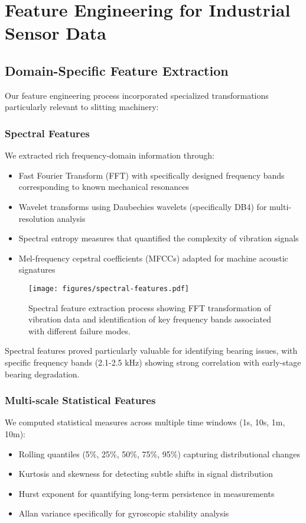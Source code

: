 \section{Feature Engineering for Industrial Sensor Data}
\subsection{Domain-Specific Feature Extraction}
Our feature engineering process incorporated specialized transformations particularly relevant to slitting machinery:

\subsubsection{Spectral Features}
We extracted rich frequency-domain information through:
\begin{itemize}
    \item Fast Fourier Transform (FFT) with specifically designed frequency bands corresponding to known mechanical resonances
    \item Wavelet transforms using Daubechies wavelets (specifically DB4) for multi-resolution analysis
    \item Spectral entropy measures that quantified the complexity of vibration signals
    \item Mel-frequency cepstral coefficients (MFCCs) adapted for machine acoustic signatures
\end{itemize}

\begin{figure}[t]
\centering
\texttt{[image: figures/spectral-features.pdf]}
\caption{Spectral feature extraction process showing FFT transformation of vibration data and identification of key frequency bands associated with different failure modes.}
\label{fig:spectral_features}
\end{figure}

Spectral features proved particularly valuable for identifying bearing issues, with specific frequency bands (2.1-2.5 kHz) showing strong correlation with early-stage bearing degradation.

\subsubsection{Multi-scale Statistical Features}
We computed statistical measures across multiple time windows (1s, 10s, 1m, 10m):
\begin{itemize}
    \item Rolling quantiles (5\%, 25\%, 50\%, 75\%, 95\%) capturing distributional changes
    \item Kurtosis and skewness for detecting subtle shifts in signal distribution
    \item Hurst exponent for quantifying long-term persistence in measurements
    \item Allan variance specifically for gyroscopic stability analysis
\end{itemize}

